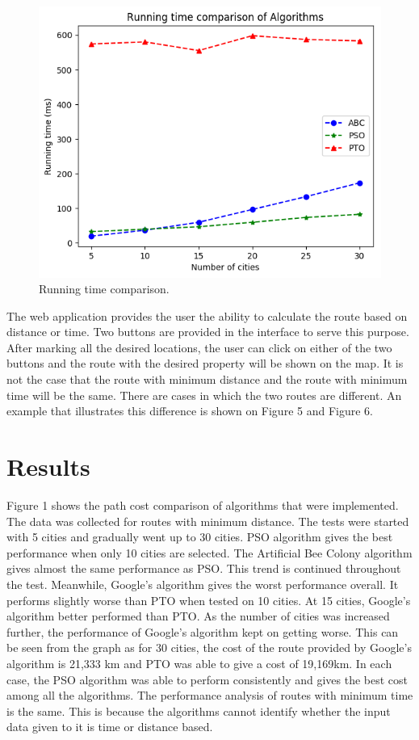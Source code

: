 \documentclass[conference]{IEEEtran}
\begin{document}
\begin{figure}[htbp]
\centerline{\includegraphics[width=\columnwidth]{runtime.png}}
\caption{Running time comparison.}
\label{fig2}
\end{figure}

The web application provides the user the ability to calculate the route based on distance or time. Two buttons are provided in the interface to serve this purpose. After marking all the desired locations, the user can click on either of the two buttons and the route with the desired property will be shown on the map. It is not the case that the route with minimum distance and the route with minimum time will be the same. There are cases in which the two routes are different. An example that illustrates this difference is shown on Figure 5 and Figure 6.

\section {Results}

Figure 1 shows the path cost comparison of algorithms that were implemented. The data was collected for routes with minimum distance. The tests were started with 5 cities and gradually went up to 30 cities. PSO algorithm gives the best performance when only 10 cities are selected. The Artificial Bee Colony algorithm gives almost the same performance as PSO.  This trend is continued throughout the test. Meanwhile, Google’s algorithm gives the worst performance overall. It performs slightly worse than PTO when tested on 10 cities. At 15 cities, Google’s algorithm better performed than PTO. As the number of cities was increased further, the performance of Google’s algorithm kept on getting worse. This can be seen from the graph as for 30 cities, the cost of the route provided by Google’s algorithm is 21,333 km and PTO was able to give a cost of 19,169km. In each case, the PSO algorithm was able to perform consistently and gives the best cost among all the algorithms. The performance analysis of routes with minimum time is the same. This is because the algorithms cannot identify whether the input data given to it is time or distance based.
\end{document}
